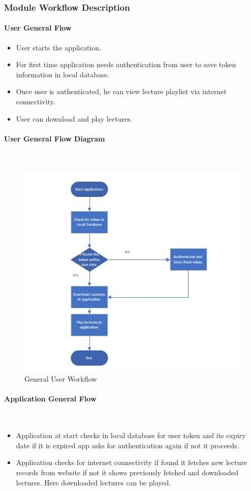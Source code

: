\documentclass[12pt]{article}
\begin{document}
\subsubsection{Module Workflow Description}
\paragraph{User General Flow}
\begin{itemize}
\item User starts the application.
\item For first time application needs authentication from user to save token information in local database.
\item Once user is authenticated, he can view lecture playlist via internet connectivity.
\item User can download and play lectures.
\end{itemize}

\paragraph{User General Flow Diagram}\mbox{}\\
\begin{figure}[h]
\includegraphics[scale=1.0]{userworkflow}
\caption{General User Workflow}
\end{figure}


\newpage
\paragraph{Application General Flow}\mbox{}\\
\begin{itemize}
\item Application at start checks in local database for user token and its expiry date if it is expired app asks for authentication again if not it proceeds.
\item Application checks for internet connectivity if found it fetches new lecture records from website if not it shows previously fetched and downloaded lectures. Here downloaded lectures can be played.
\end{itemize}
\end{document}

